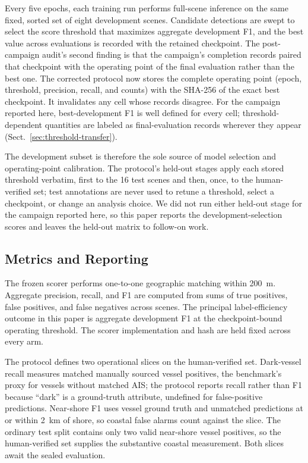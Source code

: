 Every five epochs, each training run performs full-scene inference on the same
fixed, sorted set of eight development scenes. Candidate detections are swept
to select the score threshold that maximizes aggregate development F1, and the
best value across evaluations is recorded with the retained checkpoint. The
post-campaign audit's second finding is that the campaign's completion
records paired that checkpoint with the operating point of the final
evaluation rather than the best one. The corrected protocol now stores the
complete operating point (epoch, threshold, precision, recall, and counts)
with the SHA-256 of the exact best checkpoint. It invalidates any cell whose
records disagree. For the campaign reported here, best-development F1 is well
defined for every cell; threshold-dependent quantities are labeled as
final-evaluation records wherever they appear
(Sect.~\ref{sec:threshold-transfer}).

The development subset is therefore the sole source of model selection and
operating-point calibration. The protocol's held-out stages apply each stored
threshold verbatim, first to the 16 test scenes and then, once, to the
human-verified set; test annotations are never used to retune a threshold,
select a checkpoint, or change an analysis choice. We did not run either
held-out stage for the campaign reported here, so this paper reports the
development-selection scores and leaves the held-out matrix to follow-on
work.

\subsection{Metrics and Reporting}

The frozen scorer performs one-to-one geographic matching within 200~m.
Aggregate precision, recall, and F1 are computed from sums of true positives,
false positives, and false negatives across scenes. The principal
label-efficiency outcome in this paper is aggregate development F1 at the
checkpoint-bound operating threshold. The scorer implementation and hash are
held fixed across every arm.

The protocol defines two operational slices on the human-verified set.
Dark-vessel recall measures matched manually sourced vessel positives, the
benchmark's proxy for vessels without matched AIS; the protocol reports
recall rather than F1 because ``dark'' is a ground-truth attribute,
undefined for false-positive predictions. Near-shore F1 uses vessel ground
truth and unmatched predictions at or within 2~km of shore, so coastal false
alarms count against the slice. The ordinary
test split contains only two valid near-shore vessel positives, so the
human-verified set supplies the substantive coastal measurement. Both slices
await the sealed evaluation.

